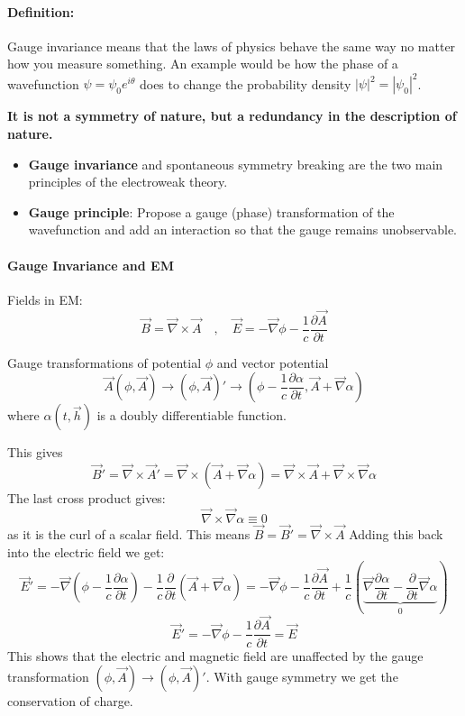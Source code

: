 \paragraph{Definition:} Gauge invariance means that the laws of physics behave the same way no  matter how you measure something. An example would be how the phase of a wavefunction $ψ = ψ_0e^{iθ}$ does to change the probability density $|ψ|^2 = |ψ_0|^2$. 

\textbf{It is not a symmetry of nature, but a redundancy in the description of nature.}

\begin{itemize}
  \item \textbf{Gauge invariance} and spontaneous symmetry breaking are the two main principles of the electroweak theory.
  \item \textbf{Gauge principle}: Propose a gauge (phase) transformation of the wavefunction and add an interaction so that the gauge remains unobservable. 
\end{itemize}

\paragraph{Gauge Invariance and EM}
  Fields in EM: 
  \begin{equation}
  \vec{B} = \vec{∇} × \vec{A} \quad , \quad  \vec{E} = - \vec{∇}ϕ - \frac{1}{c}\frac{∂ \vec{A}}{∂ t}
  \end{equation}

  Gauge transformations of potential $ϕ$ and vector potential 
  \begin{equation}
    \vec{A} (ϕ, \vec{A}) → (ϕ, \vec{A})' →  \left(ϕ - \frac{1}{c}\frac{∂ α}{∂ t}, \vec{A} + \vec{∇}α\right)    
  \end{equation}
  where $α(t, \vec{h})$ is a doubly differentiable function.

  This gives 
  \begin{equation}
    \vec{B}' = \vec{∇} × \vec{A}' = \vec{∇} × \left(\vec{A} + \vec{∇}α\right) = \vec{∇} × \vec{A} + \vec{∇} × \vec{∇}α 
  \end{equation}
  The last cross product gives: 
  \begin{equation}
    \vec{∇} × \vec{∇}α ≡ 0
  \end{equation}
  as it is the curl of a scalar field. This means $\vec{B} = \vec{B}' = \vec{∇} × \vec{A}$
  Adding this back into the electric field we get:
  \begin{equation}
    \vec{E}' = - \vec{∇} \left(ϕ - \frac{1}{c}\frac{∂ α}{∂ t}\right) - \frac{1}{c}\frac{∂}{∂ t} \left(\vec{A} + \vec{∇}α\right) = - \vec{∇}ϕ - \frac{1}{c}\frac{∂ \vec{A}}{∂ t} + \frac{1}{c}\left( \underbrace{\vec{∇} \frac{∂ α}{∂ t} - \frac{∂}{∂ t} \vec{∇}α}_{0}\right)
  \end{equation}
  \begin{equation}
    \vec{E}' = - \vec{∇}ϕ - \frac{1}{c}\frac{∂ \vec{A}}{∂ t} = \vec{E}
  \end{equation}
  This shows that the electric and magnetic field are unaffected by the gauge transformation $(ϕ,\vec{A}) → (ϕ,\vec{A})'$. With gauge symmetry we get the conservation of charge.

